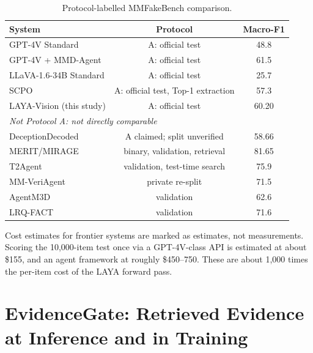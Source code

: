 \documentclass{article} %
\begin{document}
\begin{table}[t]
\centering
\small
\caption{Protocol-labelled MMFakeBench comparison.}
\label{tab:protocol}
\begin{tabular}{lcc}
\toprule
System & Protocol & Macro-F1 \\
\midrule
GPT-4V Standard & A: official test & 48.8 \\
GPT-4V + MMD-Agent & A: official test & 61.5 \\
LLaVA-1.6-34B Standard & A: official test & 25.7 \\
SCPO & A: official test, Top-1 extraction & 57.3 \\
LAYA-Vision (this study) & A: official test & 60.20 \\
\midrule
\multicolumn{3}{l}{\textit{Not Protocol A: not directly comparable}} \\
DeceptionDecoded & A claimed; split unverified & 58.66 \\
MERIT/MIRAGE & binary, validation, retrieval & 81.65 \\
T2Agent & validation, test-time search & 75.9 \\
MM-VeriAgent & private re-split & 71.5 \\
AgentM3D & validation & 62.6 \\
LRQ-FACT & validation & 71.6 \\
\bottomrule
\end{tabular}
\end{table}

Cost estimates for frontier systems are marked as estimates, not measurements. Scoring the 10,000-item test once via a GPT-4V-class API is estimated at about \$155, and an agent framework at roughly \$450--750. These are about 1,000 times the per-item cost of the LAYA forward pass.

\section{EvidenceGate: Retrieved Evidence at Inference and in Training}
\label{sec:evidencegate}
\end{document}
